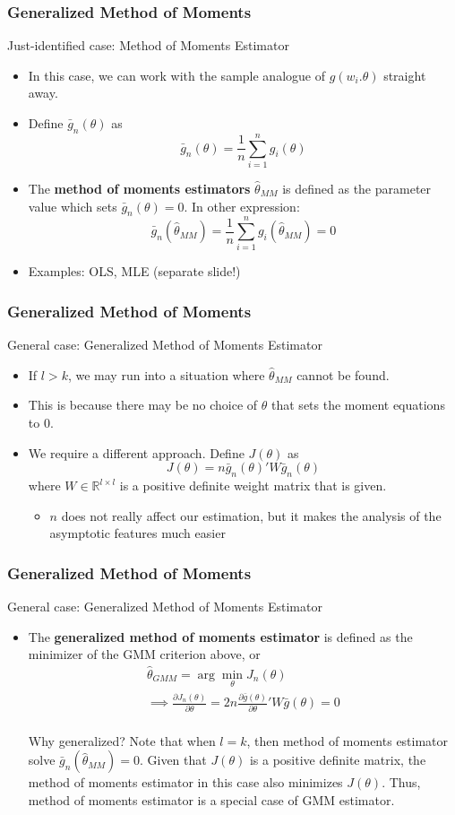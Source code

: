 \documentclass{beamer}
\begin{document}
\begin{frame}
\frametitle{Generalized Method of Moments}
Just-identified case: Method of Moments Estimator
\begin{itemize}
\item In this case, we can work with the sample analogue of $g(w_i.\theta)$ straight away.
\item Define $\bar{g}_n(\theta)$ as 
\[
\bar{g}_n(\theta)=\frac{1}{n}\sum_{i=1}^ng_i(\theta)
\]
\item The \textbf{method of moments estimators} $\hat{\theta}_{MM}$ is defined as the parameter value which sets $\bar{g}_n(\theta)=0$. In other expression:
\[
\bar{g}_n(\hat{\theta}_{MM})=\frac{1}{n}\sum_{i=1}^ng_i(\hat{\theta}_{MM})=0
\] 
\item Examples: OLS, MLE (separate slide!)
\end{itemize}
\end{frame}

\begin{frame}
\frametitle{Generalized Method of Moments}
General case: Generalized Method of Moments Estimator
\begin{itemize}
\item  If  $l>k$, we may run into a situation where $\hat{\theta}_{MM}$ cannot be found.
\item This is because there may be no choice of $\theta$ that sets the moment equations to 0.
\item We require a different approach. Define $J(\theta)$ as
\[
J(\theta)=n \bar{g}_n(\theta)'W\bar{g}_n(\theta)
\]
where $W\in\mathbb{R}^{l\times l}$ is a positive definite weight matrix that is given.
\begin{itemize}
 \item $n$ does not really affect our estimation, but it makes the analysis of the asymptotic features much easier
\end{itemize}
\end{itemize}
\end{frame}

\begin{frame}
\frametitle{Generalized Method of Moments}
General case: Generalized Method of Moments Estimator
\begin{itemize}
\item The \textbf{generalized method of moments estimator} is defined as the minimizer of the GMM criterion above, or
\begin{gather*}
\hat{\theta}_{GMM}=\arg\min_\theta J_n(\theta)\\
\implies\frac{\partial J_n(\theta)}{\partial \theta}=2n\frac{\partial \bar{g}(\theta)}{\partial\theta}'W\bar{g}(\theta)=0\\
\end{gather*}
\begin{block}{Why generalized?}
Note that when $l=k$, then method of moments estimator solve $\bar{g}_n(\hat{\theta}_{MM})=0$. Given that $J(\theta)$ is a positive definite matrix, the method of moments estimator in this case also minimizes $J(\theta)$. Thus, method of moments estimator is a special case of GMM estimator.
\end{block} 
\end{itemize}
\end{frame}
\end{document}
